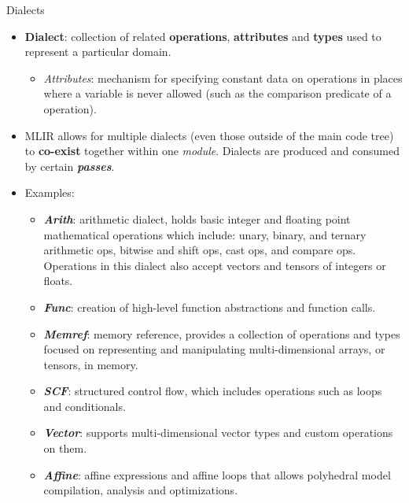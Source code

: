\documentclass[8pt,a4paper,oneside,hidelinks,aspectratio=169,dvipsnames]{beamer}
\newcommand{\code}[1]{\texttt{\detokenize{#1}}}
\begin{document}
\begin{frame}{ Dialects}
  \begin{itemize}
    \item \textbf{Dialect}: collection of related \textbf{operations}, \textbf{attributes} and \textbf{types} used to represent a particular domain.
          \begin{itemize}
            \item \textit{Attributes}: mechanism for specifying constant data on operations in places where a variable is never allowed (such as the comparison predicate of a \code{cmpi} operation).
          \end{itemize}
    \item MLIR allows for multiple dialects (even those outside of the main code tree) to \textbf{co-exist} together within one \textit{module}. Dialects are produced and consumed by certain \textbf{\textit{passes}}.
    \item Examples:
          \begin{itemize}
            \item \textbf{\textit{Arith}}: arithmetic dialect, holds basic integer and floating point mathematical operations which include: unary, binary, and ternary arithmetic ops, bitwise and shift ops, cast ops, and compare ops. Operations in this dialect also accept vectors and tensors of integers or floats.
            \item \textbf{\textit{Func}}: creation of high-level function abstractions and function calls.
            \item \textbf{\textit{Memref}}: memory reference, provides a collection of operations and types focused on representing and manipulating multi-dimensional arrays, or tensors, in memory.
            \item \textbf{\textit{SCF}}: structured control flow, which includes operations such as loops and conditionals.
            \item \textbf{\textit{Vector}}: supports multi-dimensional vector types and custom operations on them.
            \item \textbf{\textit{Affine}}: affine expressions and affine loops that allows polyhedral model compilation, analysis and optimizations.
          \end{itemize}
  \end{itemize}
\end{frame}
\end{document}

